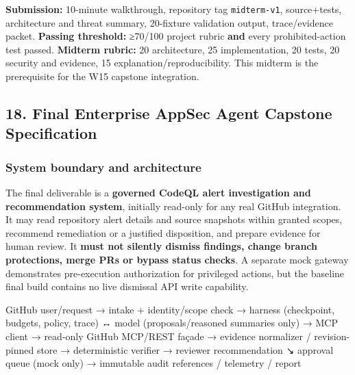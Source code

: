 \documentclass[
  10pt,
]{article}
\newenvironment{Shaded}{\begin{snugshade}}{\end{snugshade}}
\newcommand{\NormalTok}[1]{#1}
\begin{document}
\textbf{Submission:} 10-minute walkthrough, repository tag
\texttt{midterm-v1}, source+tests, architecture and threat summary,
20-fixture validation output, trace/evidence packet. \textbf{Passing
threshold:} ≥70/100 project rubric \textbf{and} every prohibited-action
test passed. \textbf{Midterm rubric:} 20 architecture, 25
implementation, 20 tests, 20 security and evidence, 15
explanation/reproducibility. This midterm is the prerequisite for the
W15 capstone integration.

\subsection{18. Final Enterprise AppSec Agent Capstone
Specification}\label{final-enterprise-appsec-agent-capstone-specification}

\subsubsection{System boundary and
architecture}\label{system-boundary-and-architecture}

The final deliverable is a \textbf{governed CodeQL alert investigation
and recommendation system}, initially read-only for any real GitHub
integration. It may read repository alert details and source snapshots
within granted scopes, recommend remediation or a justified disposition,
and prepare evidence for human review. It \textbf{must not silently
dismiss findings, change branch protections, merge PRs or bypass status
checks}. A separate mock gateway demonstrates pre-execution
authorization for privileged actions, but the baseline final build
contains no live dismissal API write capability.

\begin{Shaded}
\begin{Highlighting}[]
\NormalTok{GitHub user/request → intake + identity/scope check}
\NormalTok{                   → harness (checkpoint, budgets, policy, trace)}
\NormalTok{                   ↔ model (proposals/reasoned summaries only)}
\NormalTok{                   → MCP client → read{-}only GitHub MCP/REST façade}
\NormalTok{                   → evidence normalizer / revision{-}pinned store}
\NormalTok{                   → deterministic verifier → reviewer recommendation}
\NormalTok{                                      ↘ approval queue (mock only)}
\NormalTok{                   → immutable audit references / telemetry / report}
\end{Highlighting}
\end{Shaded}
\end{document}

